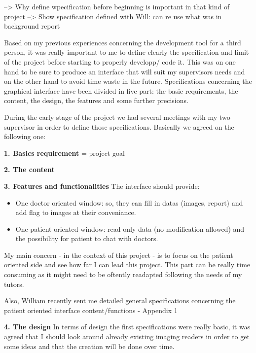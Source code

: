 --> Why define wpecification before beginning is important in that kind of project
\newline
--> Show specification defined with Will: can re use what was in background report


Based on my previous experiences concerning the development tool for a third person, it was really important to me to define clearly the specification and limit of the project before starting to properly developp/ code it. This was on one hand to be sure to produce an interface that will suit my supervisors needs and on the other hand to avoid time waste in the future. Specifications concerning the graphical interface have been divided in five part: the basic requirements, the content, the design, the features and some further precisions. 


During the early stage of the project we had several meetings with my two supervisor in order to define those specifications. Basically we agreed on the following one: 


\newline \vspace{5mm}
\textbf{1. Basics requirement}
= project goal


\newline \vspace{5mm}
\textbf{2. The content}


\newline \vspace{5mm}
\textbf{3. Features and functionalities}
The interface should provide:
\begin{itemize}
\item One doctor oriented window: so, they can fill in datas (images, report) and add flag to images at their conveniance.
\item One patient oriented window: read only data (no modification allowed) and the possibility for patient to chat with doctors.

\end{itemize}

My main concern - in the context of this project - is to focus on the patient oriented side and see how far I can lead this project. This part can be really time consuming as it might need to be oftently readapted following the needs of my tutors.

Also, William recently sent me detailed general specifications concerning the patient oriented interface content/functions - Appendix 1


\newline \vspace{5mm}
\textbf{4. The design}
In terms of design the first specifications were really basic, it was agreed that I should look around already existing imaging readers in order to get some ideas and that the creation will be done over time. 

